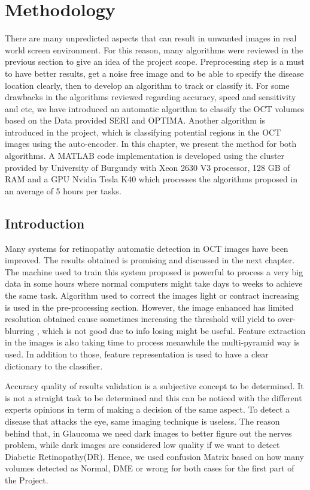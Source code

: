 \chapter{Methodology} \label{chap:Methodology}

There are many unpredicted aspects that can result in unwanted images in real world screen environment.
For this reason, many algorithms were reviewed in the previous section to give an idea of the project scope.
Preprocessing step is a must to have better results, get a noise free image and to be able to specify the disease location clearly, then to develop an algorithm to track or classify it.
For some drawbacks in the algorithms reviewed regarding accuracy, speed and sensitivity and etc, we have introduced an automatic algorithm to classify the OCT volumes based on the Data provided SERI and OPTIMA.
Another algorithm is introduced in the project, which is classifying potential regions in the OCT images using the auto-encoder.
In this chapter, we present the method for both algorithms.
A MATLAB code implementation is developed using the cluster provided by University of Burgundy with Xeon 2630 V3 processor, 128 GB of RAM and a GPU Nvidia Tesla K40 which processes the algorithms proposed in an average of 5 hours per tasks.

\section{Introduction}

Many systems for retinopathy automatic detection in OCT images have been improved.
The results obtained is promising and discussed in the next chapter.
The machine used to train this system proposed is powerful to process a very big data in some hours where normal computers might take days to weeks to achieve the same task.
Algorithm used to correct the images light or contract increasing is used in the pre-processing section.
However, the image enhanced has limited resolution obtained cause sometimes increasing the threshold will yield to over-blurring , which is not good due to info losing might be useful.
Feature extraction in the images is also taking time to process meanwhile the multi-pyramid way is used.
In addition to those, feature representation is used to have a clear dictionary to the classifier.

Accuracy quality of results validation is a subjective concept to be determined.
It is not a straight task to be determined and this can be noticed with the different experts opinions  in term of making a decision of the same aspect.
To detect a disease that attacks the eye, same imaging technique is useless.
The reason behind that, in Glaucoma we need dark images to better figure out the nerves problem, while dark images are considered low quality if we want to detect Diabetic Retinopathy(DR).
Hence, we used confusion Matrix based on how many volumes detected as Normal, DME or wrong for both cases for the first part of the Project.

